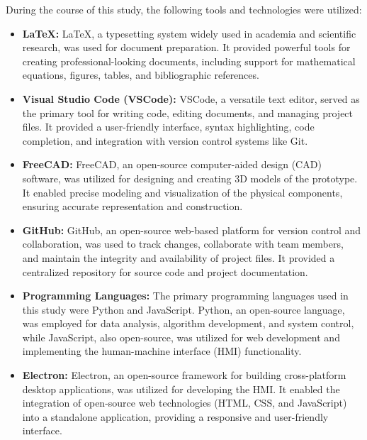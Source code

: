 \documentclass[../main.tex]{subfiles}
\begin{document}
During the course of this study, the following tools and technologies were utilized:

\begin{itemize}
    \item \textbf{LaTeX:} LaTeX, a typesetting system widely used in academia and scientific research, was used for document preparation. It provided powerful tools for creating professional-looking documents, including support for mathematical equations, figures, tables, and bibliographic references.
    
    \item \textbf{Visual Studio Code (VSCode):} VSCode, a versatile text editor, served as the primary tool for writing code, editing documents, and managing project files. It provided a user-friendly interface, syntax highlighting, code completion, and integration with version control systems like Git.
    
    \item \textbf{FreeCAD:} FreeCAD, an open-source computer-aided design (CAD) software, was utilized for designing and creating 3D models of the prototype. It enabled precise modeling and visualization of the physical components, ensuring accurate representation and construction.
    
    \item \textbf{GitHub:} GitHub, an open-source web-based platform for version control and collaboration, was used to track changes, collaborate with team members, and maintain the integrity and availability of project files. It provided a centralized repository for source code and project documentation.
    
    \item \textbf{Programming Languages:} The primary programming languages used in this study were Python and JavaScript. Python, an open-source language, was employed for data analysis, algorithm development, and system control, while JavaScript, also open-source, was utilized for web development and implementing the human-machine interface (HMI) functionality.
    
    \item \textbf{Electron:} Electron, an open-source framework for building cross-platform desktop applications, was utilized for developing the HMI. It enabled the integration of open-source web technologies (HTML, CSS, and JavaScript) into a standalone application, providing a responsive and user-friendly interface.
\end{itemize}
\end{document}
